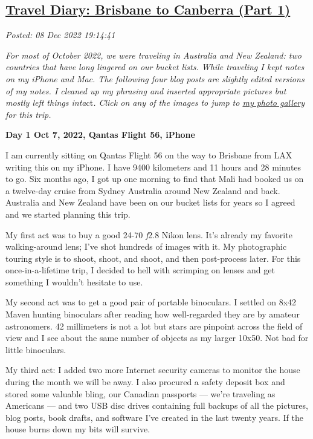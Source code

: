 %

\subsection*{\href{https://analyzethedatanotthedrivel.org/2022/12/08/travel-diary-brisbane-to-canberra-part-1/}{Travel Diary: Brisbane to Canberra (Part 1)}}


\noindent\emph{Posted: 08 Dec 2022 19:14:41}
\vspace{6pt}

\emph{For most of October 2022, we were traveling in
Australia and New Zealand: two countries that have long lingered on our
bucket lists. While traveling I kept notes on my iPhone and Mac. The
following four blog posts are slightly edited versions of my notes. I
cleaned up my phrasing and inserted appropriate pictures but mostly left
things inta}ct\emph{. Click on any of the images to jump to
\href{https://conceptcontrol.smugmug.com/Trips/Overseas/Australia-New-Zealand-2022/}{my
photo gallery} for this trip.}

\textbf{Day 1 Oct 7, 2022, Qantas Flight 56, iPhone}

I am currently sitting on Qantas Flight 56 on the way to Brisbane from
LAX writing this on my iPhone. I have 9400 kilometers and 11 hours and
28 minutes to go. Six months ago, I got up one morning to find that Mali
had booked us on a twelve-day cruise from Sydney Australia around New
Zealand and back. Australia and New Zealand have been on our bucket
lists for years so I agreed and we started planning this trip.

My first act was to buy a good 24-70 \textit{f}2.8 Nikon lens. It's already my
favorite walking-around lens; I've shot hundreds of images with it. My
photographic touring style is to shoot, shoot, and shoot, and then
post-process later. For this once-in-a-lifetime trip, I decided to hell
with scrimping on lenses and get something I wouldn't hesitate to use.

My second act was to get a good pair of portable binoculars. I settled
on 8x42 Maven hunting binoculars after reading how well-regarded they
are by amateur astronomers. 42 millimeters is not a lot but stars are
pinpoint across the field of view and I see about the same number of
objects as my larger 10x50. Not bad for little binoculars.

My third act: I added two more Internet security cameras to monitor the
house during the month we will be away. I also procured a safety deposit
box and stored some valuable bling, our Canadian passports --- we're
traveling as Americans --- and two USB disc drives containing full
backups of all the pictures, blog posts, book drafts, and software I've
created in the last twenty years. If the house burns down my bits will
survive.

